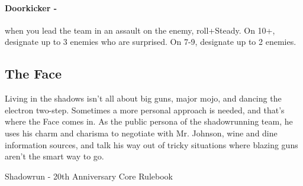 \paragraph{Doorkicker -} when you lead the team in an assault on the enemy, roll+Steady. On 10+, designate up to 3 enemies who are surprised. On 7-9, designate up to 2 enemies.



\clearpage
\subsection{The Face}
\epigraph{Living in the shadows isn’t all about big guns, major mojo, and dancing the electron two-step. Sometimes a more personal approach is needed, and that’s where the Face comes in. As the public persona of the shadowrunning team, he uses his charm and charisma to negotiate with Mr. Johnson, wine and dine information sources, and talk his way out of tricky situations where blazing guns aren’t the smart way to go.}{Shadowrun - 20th Anniversary Core Rulebook}

